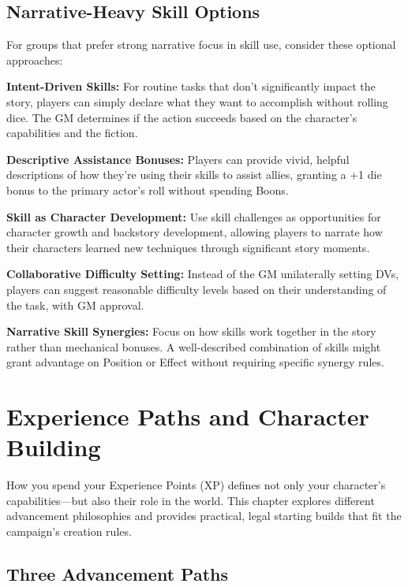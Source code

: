\documentclass[11pt,twoside,openany]{book}
\begin{document}
\section*{Narrative-Heavy Skill Options} 

For groups that prefer strong narrative focus in skill use, consider these optional approaches:

\textbf{Intent-Driven Skills:} For routine tasks that don't significantly impact the story, players can simply declare what they want to accomplish without rolling dice. The GM determines if the action succeeds based on the character's capabilities and the fiction.

\textbf{Descriptive Assistance Bonuses:} Players can provide vivid, helpful descriptions of how they're using their skills to assist allies, granting a +1 die bonus to the primary actor's roll without spending Boons.

\textbf{Skill as Character Development:} Use skill challenges as opportunities for character growth and backstory development, allowing players to narrate how their characters learned new techniques through significant story moments.

\textbf{Collaborative Difficulty Setting:} Instead of the GM unilaterally setting DVs, players can suggest reasonable difficulty levels based on their understanding of the task, with GM approval.

\textbf{Narrative Skill Synergies:} Focus on how skills work together in the story rather than mechanical bonuses. A well-described combination of skills might grant advantage on Position or Effect without requiring specific synergy rules.

\chapter{Experience Paths and Character Building} \label{ch:paths}

How you spend your Experience Points (XP) defines not only your character's capabilities---but also their role in the world. This chapter explores different advancement philosophies and provides practical, legal starting builds that fit the campaign's creation rules.

\section*{Three Advancement Paths} 
\end{document}
